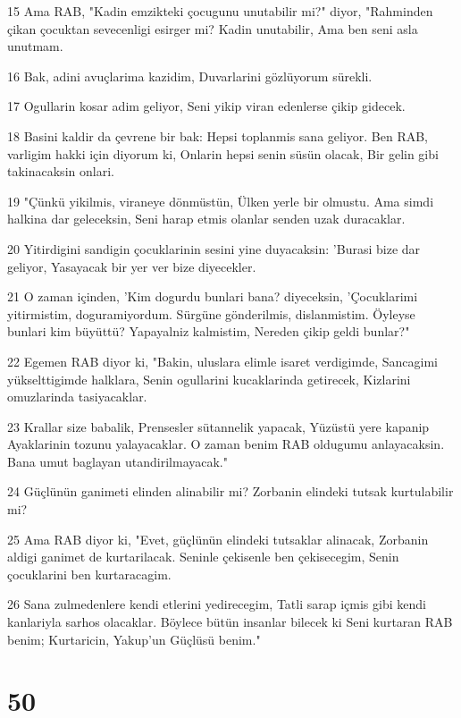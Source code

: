 \par 15 Ama RAB, "Kadin emzikteki çocugunu unutabilir mi?" diyor, "Rahminden çikan çocuktan sevecenligi esirger mi? Kadin unutabilir, Ama ben seni asla unutmam.
\par 16 Bak, adini avuçlarima kazidim, Duvarlarini gözlüyorum sürekli.
\par 17 Ogullarin kosar adim geliyor, Seni yikip viran edenlerse çikip gidecek.
\par 18 Basini kaldir da çevrene bir bak: Hepsi toplanmis sana geliyor. Ben RAB, varligim hakki için diyorum ki, Onlarin hepsi senin süsün olacak, Bir gelin gibi takinacaksin onlari.
\par 19 "Çünkü yikilmis, viraneye dönmüstün, Ülken yerle bir olmustu. Ama simdi halkina dar geleceksin, Seni harap etmis olanlar senden uzak duracaklar.
\par 20 Yitirdigini sandigin çocuklarinin sesini yine duyacaksin: 'Burasi bize dar geliyor, Yasayacak bir yer ver bize diyecekler.
\par 21 O zaman içinden, 'Kim dogurdu bunlari bana? diyeceksin, 'Çocuklarimi yitirmistim, doguramiyordum. Sürgüne gönderilmis, dislanmistim. Öyleyse bunlari kim büyüttü? Yapayalniz kalmistim, Nereden çikip geldi bunlar?"
\par 22 Egemen RAB diyor ki, "Bakin, uluslara elimle isaret verdigimde, Sancagimi yükselttigimde halklara, Senin ogullarini kucaklarinda getirecek, Kizlarini omuzlarinda tasiyacaklar.
\par 23 Krallar size babalik, Prensesler sütannelik yapacak, Yüzüstü yere kapanip Ayaklarinin tozunu yalayacaklar. O zaman benim RAB oldugumu anlayacaksin. Bana umut baglayan utandirilmayacak."
\par 24 Güçlünün ganimeti elinden alinabilir mi? Zorbanin elindeki tutsak kurtulabilir mi?
\par 25 Ama RAB diyor ki, "Evet, güçlünün elindeki tutsaklar alinacak, Zorbanin aldigi ganimet de kurtarilacak. Seninle çekisenle ben çekisecegim, Senin çocuklarini ben kurtaracagim.
\par 26 Sana zulmedenlere kendi etlerini yedirecegim, Tatli sarap içmis gibi kendi kanlariyla sarhos olacaklar. Böylece bütün insanlar bilecek ki Seni kurtaran RAB benim; Kurtaricin, Yakup'un Güçlüsü benim."

\chapter{50}

